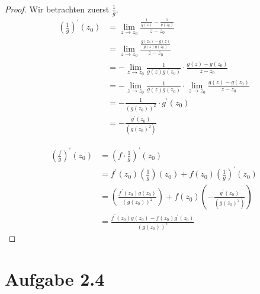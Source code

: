 \documentclass[10pt,a4paper]{article}
\begin{document}
\begin{proof}
  Wir betrachten zuerst $\frac{1}{g}$.
  \begin{align*}
    \left( \frac{1}{g} \right)^{'}(z_{0}) & = \lim_{z \to z_{0}} \frac{\frac{1}{g(z)} - \frac{1}{g(z_{0})}}{z - z_{0}}\\
                                          & = \lim_{z \to z_{0}} \frac{\frac{g(z_{0}) - g(z)}{g(z)g(z_{0})}}{z - z_{0}}\\
                                          & = - \lim_{z \to z_{0}} \frac{1}{g(z)g(z_{0})} \cdot \frac{g(z) - g(z_{0})}{z - z_{0}}\\
                                          & = - \lim_{z \to z_{0}} \frac{1}{g(z)g(z_{0})} \cdot \lim_{z \to z_{0}} \frac{g(z) - g(z_{0})}{z - z_{0}}\\
                                          & = -\frac{1}{(g(z_{0}))^{2}} \cdot g^{'}(z_{0})\\
                                          & = -\frac{g^{'}(z_{0})}{(g(z_{0})^{2})}
  \end{align*}

  \begin{align*}
    \left( \frac{f}{g} \right)^{'}(z_{0}) & = \left( f \cdot \frac{1}{g} \right)^{'}(z_{0})\\
                                          & = f^{'}(z_{0})\left( \frac{1}{g} \right)(z_{0}) + f(z_{0})\left( \frac{1}{g} \right)^{'}(z_{0})\\
                                          & = \left( \frac{f^{'}(z_{0})g(z_{0})}{(g(z_{0}))^{2}} \right) + f(z_{0})\left( -\frac{g^{'}(z_{0})}{(g(z_{0})^{2})} \right)\\
                                          & = \frac{f^{'}(z_{0})g(z_{0}) - f(z_{0})g^{'}(z_{0})}{(g(z_{0}))^{2}}
  \end{align*}
\end{proof}

\section{Aufgabe 2.4}
\end{document}
